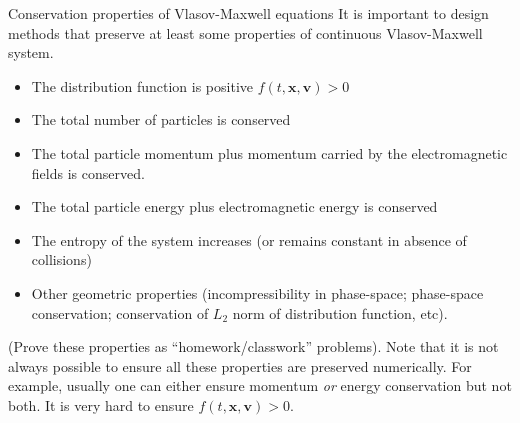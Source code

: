 \documentclass[pdf]{beamer}
\newcommand{\mvec}[1]{\mathbf{#1}}
\theoremstyle{definition}
\begin{document}
\begin{frame}{Conservation properties of Vlasov-Maxwell equations}
  \small%
  It is important to design methods that preserve at least some
  properties of continuous Vlasov-Maxwell system.
  \begin{itemize}
  \item The distribution function is positive
    $f(t,\mvec{x},\mvec{v})>0$
  \item The total number of particles is conserved
  \item The total particle momentum plus momentum carried by the
    electromagnetic fields is conserved.
  \item The total particle energy plus electromagnetic energy is
    conserved
  \item The entropy of the system increases (or remains constant in
    absence of collisions)
  \item Other geometric properties (incompressibility in phase-space;
    phase-space conservation; conservation of $L_2$ norm of
    distribution function, etc).
  \end{itemize}
  (Prove these properties as ``homework/classwork'' problems). Note
  that it is not always possible to ensure all these properties are
  preserved numerically. For example, usually one can either ensure
  momentum \emph{or} energy conservation but not both. It is very hard
  to ensure $f(t,\mvec{x},\mvec{v})>0$.
\end{frame}
\end{document}
